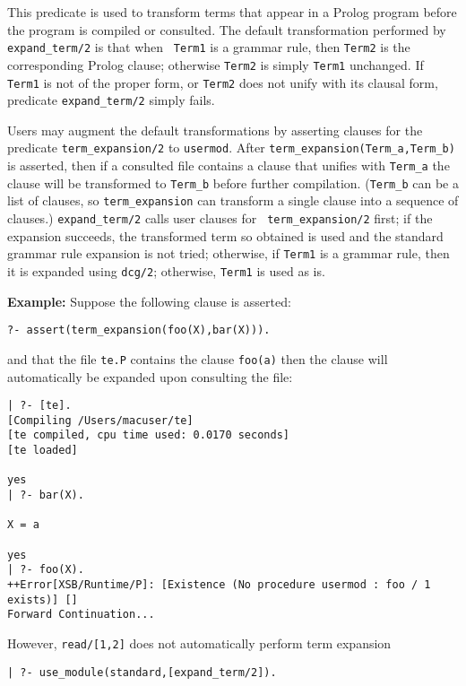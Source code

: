 \begin{description}
%
This predicate is used to transform terms that appear in a Prolog
program before the program is compiled or consulted.  The default
transformation performed by {\tt expand\_term/2} is that when {\tt
  Term1} is a grammar rule, then {\tt Term2} is the corresponding
Prolog clause; otherwise {\tt Term2} is simply {\tt Term1}
unchanged. If {\tt Term1} is not of the proper form, or {\tt Term2}
does not unify with its clausal form, predicate {\tt expand\_term/2}
simply fails.

Users may augment the default transformations by asserting clauses for
the predicate {\tt term\_expansion/2}
to {\tt usermod}.  After {\tt term\_expansion(Term\_a,Term\_b)} is
asserted, then if a consulted file contains a clause that unifies with
{\tt Term\_a} the clause will be transformed to {\tt Term\_b} before
further compilation.  ({\tt Term\_b} can be a list of clauses, so 
{\tt term\_expansion} can transform a single clause into a sequence of 
clauses.)
{\tt expand\_term/2} calls user clauses for {\tt
  term\_expansion/2} first; if the expansion succeeds, the transformed
term so obtained is used and the standard grammar rule expansion is
not tried; otherwise, if {\tt Term1} is a grammar rule, then it is
expanded using {\tt dcg/2}; otherwise, {\tt Term1} is used as is.

{\bf Example:} 
%
Suppose the following clause is asserted:
%
\begin{verbatim}
?- assert(term_expansion(foo(X),bar(X))).
\end{verbatim}
and that the file {\tt te.P} contains the clause
%
{\tt foo(a)}
%
then the clause will automatically be expanded upon consulting the file:
%
\begin{verbatim}
| ?- [te].
[Compiling /Users/macuser/te]
[te compiled, cpu time used: 0.0170 seconds]
[te loaded]

yes
| ?- bar(X).

X = a

yes
| ?- foo(X).
++Error[XSB/Runtime/P]: [Existence (No procedure usermod : foo / 1 exists)] []
Forward Continuation...
\end{verbatim}

However, {\tt read/[1,2]} does not automatically perform term expansion
%
\begin{verbatim}
| ?- use_module(standard,[expand_term/2]).


\end{verbatim}
\end{description}

